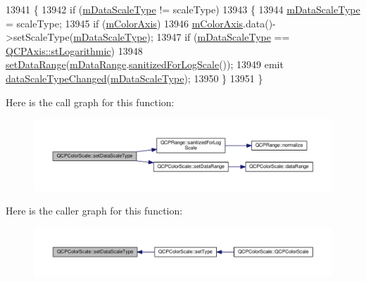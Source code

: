 \begin{DoxyCode}
13941 \{
13942   \textcolor{keywordflow}{if} (\hyperlink{class_q_c_p_color_scale_a2754d6a78736f64a241e333fbd955372}{mDataScaleType} != scaleType)
13943   \{
13944     \hyperlink{class_q_c_p_color_scale_a2754d6a78736f64a241e333fbd955372}{mDataScaleType} = scaleType;
13945     \textcolor{keywordflow}{if} (\hyperlink{class_q_c_p_color_scale_a2efbc90fd31898fe05d2b74a8422b1d5}{mColorAxis})
13946       \hyperlink{class_q_c_p_color_scale_a2efbc90fd31898fe05d2b74a8422b1d5}{mColorAxis}.data()->setScaleType(\hyperlink{class_q_c_p_color_scale_a2754d6a78736f64a241e333fbd955372}{mDataScaleType});
13947     \textcolor{keywordflow}{if} (\hyperlink{class_q_c_p_color_scale_a2754d6a78736f64a241e333fbd955372}{mDataScaleType} == \hyperlink{class_q_c_p_axis_a36d8e8658dbaa179bf2aeb973db2d6f0abf5b785ad976618816dc6f79b73216d4}{QCPAxis::stLogarithmic})
13948       \hyperlink{class_q_c_p_color_scale_abe88633003a26d1e756aa74984587fef}{setDataRange}(\hyperlink{class_q_c_p_color_scale_a5d4853feb32cd0077bb2b871687c844b}{mDataRange}.\hyperlink{class_q_c_p_range_aaf6a9046e78d91eeb8e89584fe46b034}{sanitizedForLogScale}());
13949     emit \hyperlink{class_q_c_p_color_scale_a61558b962f7791ff2f15a565dcf60181}{dataScaleTypeChanged}(\hyperlink{class_q_c_p_color_scale_a2754d6a78736f64a241e333fbd955372}{mDataScaleType});
13950   \}
13951 \}
\end{DoxyCode}


Here is the call graph for this function\+:\nopagebreak
\begin{figure}[H]
\begin{center}
\leavevmode
\includegraphics[width=350pt]{class_q_c_p_color_scale_aeb6107d67dd7325145b2498abae67fc3_cgraph}
\end{center}
\end{figure}




Here is the caller graph for this function\+:\nopagebreak
\begin{figure}[H]
\begin{center}
\leavevmode
\includegraphics[width=350pt]{class_q_c_p_color_scale_aeb6107d67dd7325145b2498abae67fc3_icgraph}
\end{center}
\end{figure}


